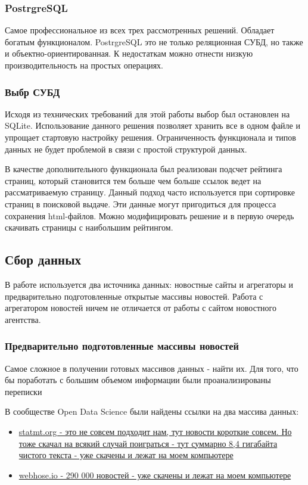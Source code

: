 \subsubsection{PostrgreSQL}

Самое профессиональное из всех трех рассмотренных решений. Обладает богатым функционалом. PostrgreSQL это не только реляционная СУБД, но также и объектно-ориентированная. К недостаткам можно отнести низкую производительность на простых операциях.

\subsubsection{Выбр СУБД}

Исходя из технических требований для этой работы выбор был остановлен на SQLite. Использование данного решения позволяет хранить все в одном файле и упрощает стартовую настройку решения. Ограниченность функционала и типов данных не будет проблемой в связи с простой структурой данных.

В качестве дополнительного функционала был реализован подсчет рейтинга страниц, который становится тем больше чем больше ссылок ведет на рассматриваемую страницу. Данный подход часто используется при сортировке страниц в поисковой выдаче. Эти данные могут пригодиться для процесса сохранения html-файлов. Можно модифицировать решение и в первую очередь скачивать страницы с наибольшим рейтингом.

\subsection{Сбор данных}

В работе используется два источника данных: новостные сайты и агрегаторы и предварительно подготовленные открытые массивы новостей. Работа с агрегатором новостей ничем не отличается от работы с сайтом новостного агентства.

\subsubsection{Предварительно подготовленные массивы новостей}

Самое сложное в получении готовых массивов данных - найти их. Для того, что бы поработать с большим объемом информации были проанализированы переписки 

В сообществе Open Data Science были найдены ссылки на два массива данных:

\begin{itemize}
    \item \href{http://www.statmt.org/wmt15/translation-task.html}{statmt.org - это не совсем подходит нам, тут новости короткие совсем. Но тоже скачал на всякий случай поиграться - тут суммарно 8,4 гигабайта чистого текста - уже скачены и лежат на моем компьютере}
    \item \href{https://webhose.io/free-datasets/russian-news-articles/}{webhose.io - 290 000 новостей - уже скачены и лежат на моем компьютере}
\end{itemize}
~\

